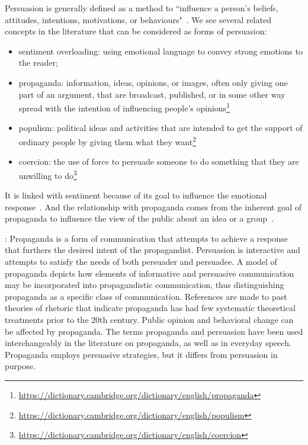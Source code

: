 Persuasion is generally defined as a method to ``influence a person's beliefs, attitudes, intentions, motivations, or behaviours"~\cite{gass2018persuasion}.
We see several related concepts in the literature that can be considered as forms of persuasion:
\begin{itemize}
    \item sentiment overloading: using emotional language to convey strong emotions to the reader; %
    \item \gls{propaganda}:  information, ideas, opinions, or images, often only giving one part of an argument, that are broadcast, published, or in some other way spread with the intention of influencing people's opinions\footnote{\url{https://dictionary.cambridge.org/dictionary/english/propaganda}} %
    \item \gls{populism}: political ideas and activities that are intended to get the support of ordinary people by giving them what they want\footnote{\url{https://dictionary.cambridge.org/dictionary/english/populism}}
    \item coercion: the use of force to persuade someone to do something that they are unwilling to do\footnote{\url{https://dictionary.cambridge.org/dictionary/english/coercion}} %
\end{itemize}


It is linked with sentiment because of its goal to influence the emotional response~\citep{gatti2014sentiment,rocklage2018persuasion,petty2015emotion,desteno2004discrete}.
And the relationship with propaganda comes from the inherent goal of propaganda to influence the view of the public about an idea or a group~\citep{bernays,jowett2018propaganda}.



\cite{jowett2012propaganda}:
Propaganda  is  a  form  of  communication  that  attempts  to  achieve a  response  that  furthers  the  desired  intent  of  the  propagandist. Persuasion is interactive and attempts to satisfy the needs of both persuader  and  persuadee.  A  model  of  propaganda  depicts  how  elements of  informative  and  persuasive  communication  may  be  incorporated into  propagandistic  communication,  thus  distinguishing  propaganda as  a  specific  class  of  communication.  References  are  made  to  past theories  of  rhetoric  that  indicate  propaganda  has  had  few  systematic theoretical  treatments  prior  to  the  20th  century.  Public  opinion  and behavioral change can be affected by propaganda.
The terms propaganda and persuasion have been used interchangeably in the literature on propaganda, as well as in everyday speech. Propaganda employs persuasive strategies, but it differs from persuasion in purpose.

